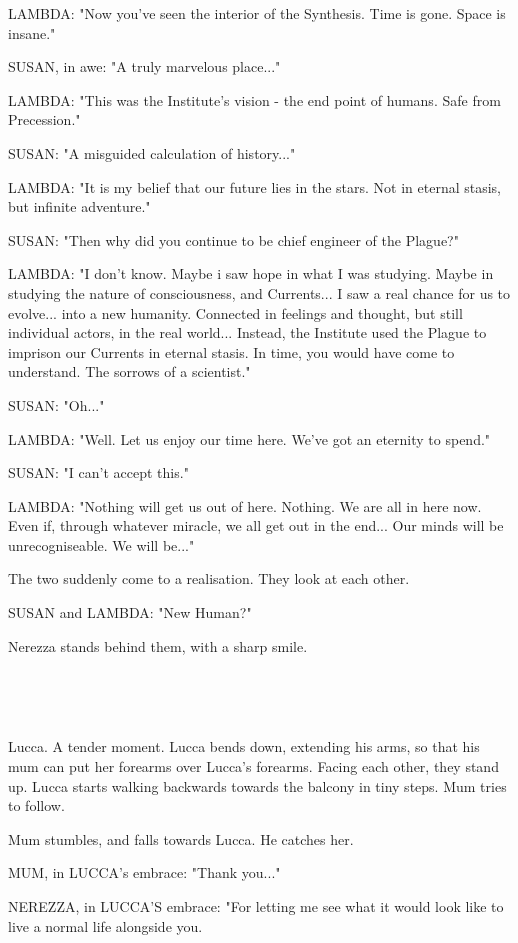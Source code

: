 \documentclass[11pt]{article}
\begin{document}
LAMBDA: "Now you've seen the interior of the Synthesis.
Time is gone. Space is insane."

SUSAN, in awe: "A truly marvelous place..."

LAMBDA: "This was the Institute's vision - the end point of humans. 
Safe from Precession."

SUSAN: "A misguided calculation of history..."

LAMBDA: "It is my belief that our future lies in the stars. 
Not in eternal stasis, but infinite adventure."

SUSAN: "Then why did you continue to be chief engineer of the Plague?"

LAMBDA: "I don't know. 
Maybe i saw hope in what I was studying.
Maybe in studying the nature of consciousness, and Currents...
I saw a real chance for us to evolve...
into a new humanity.
Connected in feelings and thought, but still individual actors, in the real world...
Instead, the Institute used the Plague to imprison our Currents in eternal stasis.
In time, you would have come to understand.
The sorrows of a scientist."

SUSAN: "Oh..."

LAMBDA: "Well. 
Let us enjoy our time here. 
We've got an eternity to spend."

SUSAN: "I can't accept this."

LAMBDA: "Nothing will get us out of here. 
Nothing.
We are all in here now.
Even if, through whatever miracle, we all get out in the end...
Our minds will be unrecogniseable.
We will be..."

The two suddenly come to a realisation.
They look at each other.

SUSAN and LAMBDA: "New Human?"

Nerezza stands behind them, with a sharp smile.

\ 

\ 

Lucca.
A tender moment.
Lucca bends down, extending his arms, so that his mum can put her forearms over Lucca's forearms.
Facing each other, they stand up.
Lucca starts walking backwards towards the balcony in tiny steps.
Mum tries to follow.

Mum stumbles, and falls towards Lucca.
He catches her.

MUM, in LUCCA's embrace: "Thank you..."

NEREZZA, in LUCCA'S embrace: "For letting me see what it would look like to live a normal life alongside you.
\end{document}
